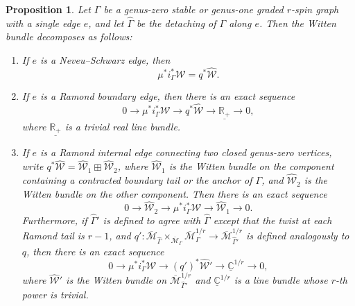 \documentclass[11pt,a4paper]{article}
\newtheorem{pr}[dummy]{Proposition}
\theoremstyle{definition}
\theoremstyle{remark}
\numberwithin{equation}{section}
\def\Mbar{{\overline{\mathcal M}}}
\begin{document}
\begin{pr}
\label{prop decomposition g=0,1}
Let $\Gamma$ be a genus-zero stable or genus-one graded $r$-spin graph with a single edge $e$, and let $\widehat{\Gamma}$ be the detaching of $\Gamma$ along $e$.  Then the Witten bundle decomposes as follows:
\begin{enumerate}
\item\label{it NS} If $e$ is a Neveu--Schwarz edge, then \begin{equation}\label{eq NSdecompses}
\mu^*i_{\Gamma}^*{\mathcal{W}} = q^*\widehat{{\mathcal{W}}}.
\end{equation}

\item\label{it decompose Ramond boundary edge} If $e$ is a Ramond boundary edge, then there is an exact sequence
\begin{equation}
\label{eq decompose}0 \to \mu^*i_{\Gamma}^*{\mathcal{W}} \to q^*\widehat{{\mathcal{W}}} \to \underline{\mathbb{R}_+} \to 0,
\end{equation}
where $\underline{\mathbb{R}_+}$ is a trivial real line bundle.

\item If $e$ is a Ramond internal edge connecting two closed genus-zero vertices, write $q^*\widehat{\mathcal{W}} = \widehat{\mathcal{W}}_1 \boxplus \widehat{\mathcal{W}}_2$, where $\widehat{\mathcal{W}}_1$ is the Witten bundle on the component containing a contracted boundary tail or the anchor of $\Gamma$, and $\widehat{\mathcal{W}}_2$ is the Witten bundle on the other component.  Then there is an exact sequence
\begin{equation}
\label{eq decompose2}
0 \to \widehat{\mathcal{W}}_2 \to \mu^*i_{\Gamma}^*{\mathcal{W}} \to \widehat{\mathcal{W}}_1 \to 0.
\end{equation}
Furthermore, if $\widehat\Gamma'$ is defined to agree with $\widehat\Gamma$ except that the twist at each Ramond tail is $r-1$, and $q': \Mbar_{\widehat{\Gamma}} \times_{\Mbar_{\Gamma}} \Mbar_{\Gamma}^{1/r} \to \Mbar_{\widehat\Gamma'}^{1/r}$ is defined analogously to $q$, then there is an exact sequence
\begin{equation}
\label{eq decompose3}
0 \to \mu^*i_{\Gamma}^*{\mathcal{W}} \to (q')^*\widehat{{\mathcal{W}}}' \to {\underline{\mathbb{C}}}^{1/r} \to 0,
\end{equation}
where $\widehat{{\mathcal{W}}}'$ is the Witten bundle on $\Mbar_{\widehat\Gamma'}^{1/r}$ and ${\underline{\mathbb{C}}}^{1/r}$ is a line bundle whose $r$-th power is trivial.


\end{enumerate}
\end{pr}
\end{document}
